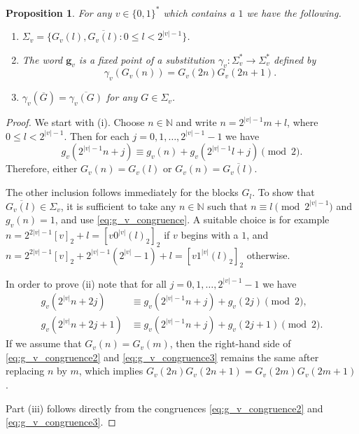 \documentclass[a4paper,11pt]{amsart}
\newtheorem{prop}[thm]{Proposition}
\theoremstyle{definition}
\newcommand{\N}{\mathbb{N}}
\begin{document}
\begin{prop} \label{prop:g_v_substitution}
For any $v\in\{0,1\}^*$ which contains a $1$ we have the following.
\begin{enumerate}[label={\textup{(\roman*)}}]
\item $\Sigma_v = \{G_v(l), \overline{G_v(l)}: 0 \leq l < 2^{|v|-1}\}$.
\item The word $\mathbf{g}_v$ is a fixed point of a substitution $\gamma_v \colon \Sigma_v^* \to \Sigma_v^*$ defined by $$\gamma_v(G_v(n)) = G_v(2n) G_v(2n+1).$$
\item $\gamma_v(\overline{G}) = \overline{\gamma_v(G)}$ for any $G \in \Sigma_v$.
\end{enumerate}
\end{prop}
\begin{proof}
We start with (i). Choose $n \in \N$ and write $n = 2^{|v|-1} m + l$, where $0 \leq l < 2^{|v|-1}$. Then for each $j = 0,1,\ldots,2^{|v|-1}-1$ we have
\begin{equation} \label{eq:g_v_congruence}
g_v(2^{|v|-1}n + j) \equiv g_v(n) + g_v(2^{|v|-1}l + j) \pmod{2}.
\end{equation}
Therefore, either $G_v(n) = G_v(l)$ or $G_v(n) = \overline{G_v(l)}$. 

The other inclusion follows immediately for the blocks $G_l$. To show that $\overline{G_v(l)} \in \Sigma_v$, it is sufficient to take any $n \in \N$ such that $n \equiv l \pmod{2^{|v|-1}}$ and $g_v(n)=1$, and use \eqref{eq:g_v_congruence}. A suitable choice is for example $n = 2^{2|v|-1} [v]_2+l = [v0^{|v|}(l)_2]_2$ if $v$ begins with a $1$, and $n = 2^{2|v|-1} [v]_2+ 2^{|v|-1}(2^{|v|}-1)+l=[v1^{|v|}(l)_2]_2$ otherwise.

In order to prove (ii) note that for all $j =0,1,\ldots, 2^{|v|-1}-1$ we have
\begin{align}
g_v(2^{|v|}n + 2j) &\equiv  g_v(2^{|v|-1}n + j) + g_v(2j) \pmod{2}, \label{eq:g_v_congruence2} \\
g_v(2^{|v|}n + 2j+1) &\equiv  g_v(2^{|v|-1}n + j) + g_v(2j+1) \pmod{2}.  \label{eq:g_v_congruence3}
\end{align}
If we assume that $G_v(n) = G_v(m)$, then the right-hand side of \eqref{eq:g_v_congruence2} and \eqref{eq:g_v_congruence3} remains the same after replacing $n$ by $m$, which implies $G_v(2n) G_v(2n+1) = G_v(2m) G_v(2m+1)$.

Part (iii) follows directly from the congruences   \eqref{eq:g_v_congruence2} and \eqref{eq:g_v_congruence3}.
\end{proof}
\end{document}
